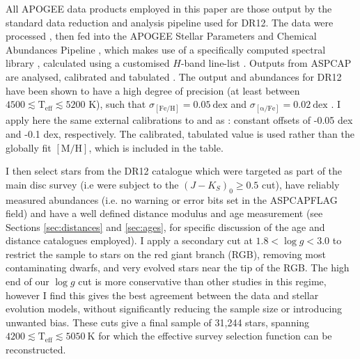  All APOGEE data products employed in this paper are those output by the standard data reduction and analysis pipeline used for DR12. The data were processed \citep{2015AJ....150..173N}, then fed into the APOGEE Stellar Parameters and Chemical Abundances Pipeline \citep[ASPCAP,][]{2016AJ....151..144G}, which makes use of a specifically computed spectral library \citep{2015AJ....149..181Z}, calculated using a customised $H$-band line-list \citep{2015ApJS..221...24S}. Outputs from ASPCAP are analysed, calibrated and tabulated \citep{2015AJ....150..148H}. The output \afe{} and \feh{} abundances for DR12 have been shown to have a high degree of precision (at least between $4500 \lesssim \mathrm{T_{\mathrm{eff}}} \lesssim 5200$ K), such that $\sigma_{\mathrm{[Fe/H]}} = 0.05\ \mathrm{dex}$ and $\sigma_{\mathrm{[\alpha/Fe]}} = 0.02\ \mathrm{dex}$ \citep{2016ApJ...823...30B}. I apply here the same external calibrations to \afe{} and \feh{} as \citet{2016ApJ...823...30B}: constant offsets of -0.05 dex and -0.1 dex, respectively. The calibrated, tabulated \feh{} value is used rather than the globally fit $\mathrm{[M/H]}$, which is included in the table.

I then select stars from the DR12 catalogue which were targeted as part of the main disc survey (i.e were subject to the $(J-K_S)_0 \geq 0.5$ cut), have reliably measured abundances (i.e. no warning or error bits set in the ASPCAPFLAG field) and have a well defined distance modulus and age measurement (see Sections \ref{sec:distances} and \ref{sec:ages}, for specific discussion of the age and distance catalogues employed). I apply a secondary cut at $1.8 < \log{g} < 3.0$ to restrict the sample to stars on the red giant branch (RGB), removing most contaminating dwarfs, and very evolved stars near the tip of the RGB. The high end of our $\log{g}$ cut is more conservative than other studies in this regime, however I find this gives the best agreement between the data and stellar evolution models, without significantly reducing the sample size or introducing unwanted bias. These cuts give a final sample of 31,244 stars, spanning $4200 \lesssim \mathrm{T_{\mathrm{eff}}} \lesssim  5050\ \mathrm{K}$ for which the effective survey selection function can be reconstructed.

